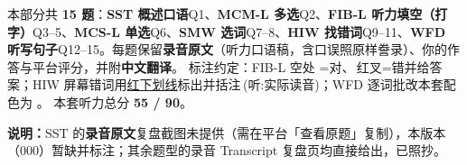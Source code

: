
\vspace{1mm}
{\small\color{gray} 本部分共 \textbf{15 题}：\textbf{SST 概述口语}Q1、\textbf{MCM-L 多选}Q2、\textbf{FIB-L 听力填空（打字）}Q3--5、\textbf{MCS-L 单选}Q6、\textbf{SMW 选词}Q7--8、\textbf{HIW 找错词}Q9--11、\textbf{WFD 听写句子}Q12--15。每题保留\textbf{录音原文}（听力口语稿，含口误照原样誊录）、你的作答与平台评分，并附\textbf{中文翻译}。
标注约定：FIB-L 空处 =对、{\color{cWrong}}\,红叉=错并给答案；HIW 屏幕错词用{\color{cWrong}\uline{红下划线}}标出并括注\,{\footnotesize\color{cFix}(听:实际读音)}；WFD 逐词批改本套配色为 \wfdlegend 。
本套听力总分 \textbf{55 / 90}。}
\vspace{1mm}

{\small\color{gray}\textbf{说明：}SST 的\textbf{录音原文}复盘截图未提供（需在平台「查看原题」复制），本版本（000）暂缺并标注；其余题型的录音 Transcript 复盘页均直接给出，已照抄。}
\vspace{2mm}


